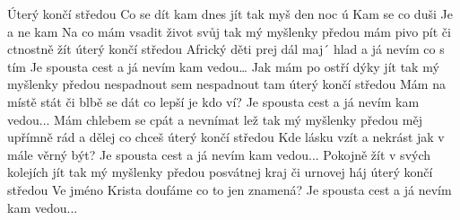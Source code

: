 \begin{TEXT}{Úterý končí středou}
\SLOKA Co  se dít kam  dnes jít\NL
tak  myš \NL
den  noc \NL
ú  \NL
Kam   se  co  duši \NL
Je   a  ne kam 
\SLOKA Na co mám vsadit život svůj\NL
tak mý myšlenky předou\NL
mám pivo pít či ctnostně žít\NL
úterý končí středou\NL
Africký děti prej dál maj´ hlad a já nevím co s tím\NL
Je spousta cest a já nevím kam vedou…
\SLOKA Jak mám po ostří dýky jít\NL
tak mý myšlenky předou\NL
nespadnout sem nespadnout tam\NL
úterý končí středou\NL
Mám na místě stát či blbě se dát co lepší je kdo ví?\NL
Je spousta cest a já nevím kam vedou...
\SLOKA Mám chlebem se cpát a nevnímat lež\NL
tak mý myšlenky předou\NL
měj upřímně rád a dělej co chceš\NL
úterý končí středou\NL
Kde lásku vzít a nekrást jak v mále věrný být?\NL
Je spousta cest a já nevím kam vedou...\pagebreak
\SLOKA Pokojně žít v svých kolejích jít\NL
tak mý myšlenky předou\NL
posvátnej kraj či urnovej háj\NL
úterý končí středou\NL
Ve jméno Krista doufáme co to jen znamená?\NL
Je spousta cest a já nevím kam vedou...
\end{TEXT}